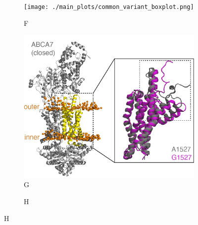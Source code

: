 \documentclass[12pt]{article}
\begin{document}
\begin{figure}[H]
\begin{subfigure}[t]{0.225\textwidth}
    \end{subfigure}
    \begin{subfigure}[t]{0.45\textwidth}
        \caption{F}
        \texttt{[image: ./main\_plots/common\_variant\_boxplot.png]}        
    \end{subfigure}
    \begin{subfigure}[t]{0.3\textwidth}
        \caption{G}
        \includegraphics[width=\textwidth]{./main_plots/abca7_structure_with_inset.png}        
    \end{subfigure}
    \begin{subfigure}[t]{0.165\textwidth}
        \caption{H}

\end{subfigure}
\end{figure}
\end{document}
